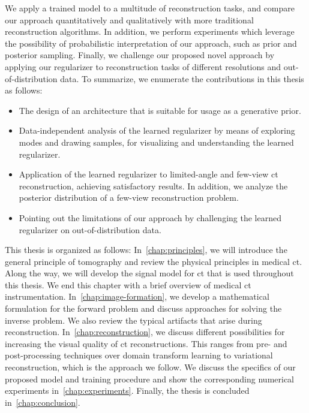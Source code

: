 \documentclass[../ml-tct.tex]{subfiles}
\begin{document}
We apply a trained model to a multitude of reconstruction tasks, and compare our approach quantitatively and qualitatively with more traditional reconstruction algorithms.
In addition, we perform experiments which leverage the possibility of probabilistic interpretation of our approach, such as prior and posterior sampling.
Finally, we challenge our proposed novel approach by applying our regularizer to reconstruction tasks of different resolutions and out-of-distribution data.
To summarize, we enumerate the contributions in this thesis as follows:
\begin{itemize}
	\item The design of an architecture that is suitable for usage as a generative prior.
	\item Data-independent analysis of the learned regularizer by means of exploring modes and drawing samples, for visualizing and understanding the learned regularizer.
	\item Application of the learned regularizer to limited-angle and few-view \gls{ct} reconstruction, achieving satisfactory results.
		In addition, we analyze the posterior distribution of a few-view reconstruction problem.
	\item Pointing out the limitations of our approach by challenging the learned regularizer on out-of-distribution data.
\end{itemize}

This thesis is organized as follows:
In~\cref{chap:principles}, we will introduce the general principle of tomography and review the physical principles in medical \gls{ct}. 
Along the way, we will develop the signal model for \gls{ct} that is used throughout this thesis.
We end this chapter with a brief overview of medical \gls{ct} instrumentation.
In~\cref{chap:image-formation}, we develop a mathematical formulation for the forward problem and discuss approaches for solving the inverse problem.
We also review the typical artifacts that arise during reconstruction.
In~\cref{chap:reconstruction}, we discuss different possibilities for increasing the visual quality of \gls{ct} reconstructions.
This ranges from pre- and post-processing techniques over domain transform learning to variational reconstruction, which is the approach we follow.
We discuss the specifics of our proposed model and training procedure and show the corresponding numerical experiments in~\cref{chap:experiments}.
Finally, the thesis is concluded in~\cref{chap:conclusion}.
\end{document}
